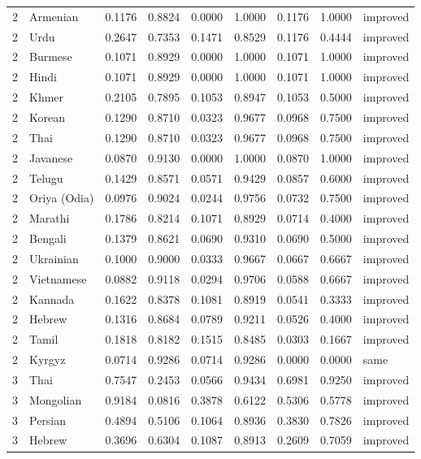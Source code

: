 \begin{tabular}{rlrrrrrrl}
2 & Armenian & 0.1176 & 0.8824 & 0.0000 & 1.0000 & 0.1176 & 1.0000 & improved \\
2 & Urdu & 0.2647 & 0.7353 & 0.1471 & 0.8529 & 0.1176 & 0.4444 & improved \\
2 & Burmese & 0.1071 & 0.8929 & 0.0000 & 1.0000 & 0.1071 & 1.0000 & improved \\
2 & Hindi & 0.1071 & 0.8929 & 0.0000 & 1.0000 & 0.1071 & 1.0000 & improved \\
2 & Khmer & 0.2105 & 0.7895 & 0.1053 & 0.8947 & 0.1053 & 0.5000 & improved \\
2 & Korean & 0.1290 & 0.8710 & 0.0323 & 0.9677 & 0.0968 & 0.7500 & improved \\
2 & Thai & 0.1290 & 0.8710 & 0.0323 & 0.9677 & 0.0968 & 0.7500 & improved \\
2 & Javanese & 0.0870 & 0.9130 & 0.0000 & 1.0000 & 0.0870 & 1.0000 & improved \\
2 & Telugu & 0.1429 & 0.8571 & 0.0571 & 0.9429 & 0.0857 & 0.6000 & improved \\
2 & Oriya (Odia) & 0.0976 & 0.9024 & 0.0244 & 0.9756 & 0.0732 & 0.7500 & improved \\
2 & Marathi & 0.1786 & 0.8214 & 0.1071 & 0.8929 & 0.0714 & 0.4000 & improved \\
2 & Bengali & 0.1379 & 0.8621 & 0.0690 & 0.9310 & 0.0690 & 0.5000 & improved \\
2 & Ukrainian & 0.1000 & 0.9000 & 0.0333 & 0.9667 & 0.0667 & 0.6667 & improved \\
2 & Vietnamese & 0.0882 & 0.9118 & 0.0294 & 0.9706 & 0.0588 & 0.6667 & improved \\
2 & Kannada & 0.1622 & 0.8378 & 0.1081 & 0.8919 & 0.0541 & 0.3333 & improved \\
2 & Hebrew & 0.1316 & 0.8684 & 0.0789 & 0.9211 & 0.0526 & 0.4000 & improved \\
2 & Tamil & 0.1818 & 0.8182 & 0.1515 & 0.8485 & 0.0303 & 0.1667 & improved \\
2 & Kyrgyz & 0.0714 & 0.9286 & 0.0714 & 0.9286 & 0.0000 & 0.0000 & same \\
3 & Thai & 0.7547 & 0.2453 & 0.0566 & 0.9434 & 0.6981 & 0.9250 & improved \\
3 & Mongolian & 0.9184 & 0.0816 & 0.3878 & 0.6122 & 0.5306 & 0.5778 & improved \\
3 & Persian & 0.4894 & 0.5106 & 0.1064 & 0.8936 & 0.3830 & 0.7826 & improved \\
3 & Hebrew & 0.3696 & 0.6304 & 0.1087 & 0.8913 & 0.2609 & 0.7059 & improved \\

\end{tabular}
